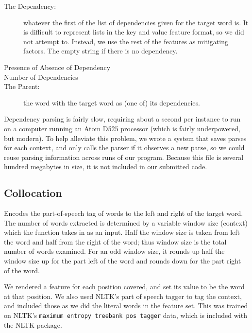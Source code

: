 \documentclass{article}
\begin{document}
\begin{description}

\item[The Dependency:] whatever the first of the list of dependencies given for
the target word is.  It is difficult to represent lists in the key and value
feature format, so we did not attempt to.  Instead, we use the rest of the
features as mitigating factors.  The empty string if there is no dependency.

\item[Presence of Absence of Dependency]

\item[Number of Dependencies]

\item[The Parent:] the word with the target word as (one of) its dependencies.

\end{description}

Dependency parsing is fairly slow, requiring about a second per instance to run
on a computer running an Atom D525 processor (which is fairly underpowered, but
modern).  To help alleviate this problem, we wrote a system that saves parses
for each context, and only calls the parser if it observes a new parse, so we
could reuse parsing information across runs of our program.  Because this file
is several hundred megabytes in size, it is not included in our
submitted code.

\subsection{Collocation}

Encodes the part-of-speech tag of words to the left and right of the target
word. The number of words extracted is determined by a variable window size
(context) which the function takes in as an input. Half the window size is
taken from left the word and half from the right of the word; thus window size
is the total number of words examined. For an odd window size, it rounds up
half the window size up for the part left of the word and rounds down for the
part right of the word.

We rendered a feature for each position covered, and set its value to be the
word at that position. We also used NLTK's part of speech tagger to
tag the context, and included those as we did the literal words in the
feature set.  This was trained on NLTK's
\verb+maximum entropy treebank pos tagger+ data, which is included
with the NLTK package.
\end{document}
